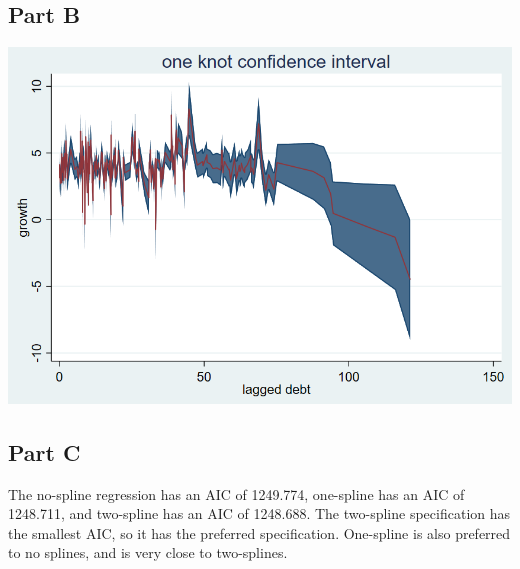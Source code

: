 \documentclass[11pt]{article} %
\begin{document}
\subsection{Part B}
\includegraphics[scale=0.7]{p5}
\subsection{Part C}
The no-spline regression has an AIC of 1249.774, one-spline has an AIC of 1248.711, and two-spline has an AIC of 1248.688. The two-spline specification has the smallest AIC, so it has the preferred specification. One-spline is also preferred to no splines, and is very close to two-splines.
\end{document}
